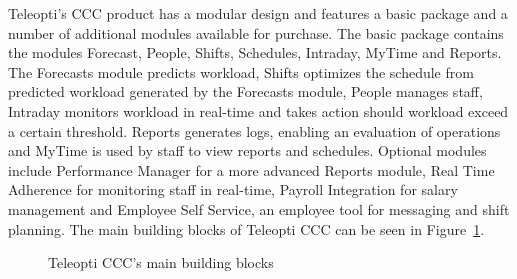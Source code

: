 {Teleopti's CCC product has a modular design and features a basic package and a number of additional modules available for purchase. The basic package contains the modules Forecast, People, Shifts, Schedules, Intraday, MyTime and Reports. The Forecasts module predicts workload, Shifts optimizes the schedule from predicted workload generated by the Forecasts module, People manages staff, Intraday monitors workload in real-time and takes action should workload exceed a certain threshold. Reports generates logs, enabling an evaluation of operations and MyTime is used by staff to view reports and schedules. Optional modules include Performance Manager for a more advanced Reports module, Real Time Adherence for monitoring staff in real-time, Payroll Integration for salary management and Employee Self Service, an employee tool for messaging and shift planning. The main building blocks of Teleopti CCC can be seen in Figure~\ref{fig:teleopticcc}.

\begin{figure}[H]
    \centering
    \caption{Teleopti CCC's main building blocks~\cite{teleopti2016}}
    \label{fig:teleopticcc}
\end{figure}

}
